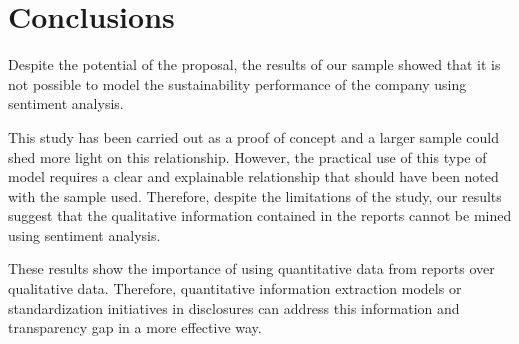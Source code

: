 \documentclass[times]{oupau}
\begin{document}


\section{Conclusions}

Despite the potential of the proposal, the results of our sample showed that it is not possible to model the sustainability performance of the company using sentiment analysis.
\par
\justify

This study has been carried out as a proof of concept and a larger sample could shed more light on this relationship. However, the practical use of this type of model requires a clear and explainable relationship that should have been noted with the sample used. Therefore, despite the limitations of the study, our results suggest that the qualitative information contained in the reports cannot be mined using sentiment analysis.
\par
\justify

These results show the importance of using quantitative data from reports over qualitative data. Therefore, quantitative information extraction models or standardization initiatives in disclosures can address this information and transparency gap in a more effective way.
\par
\justify
\end{document}
